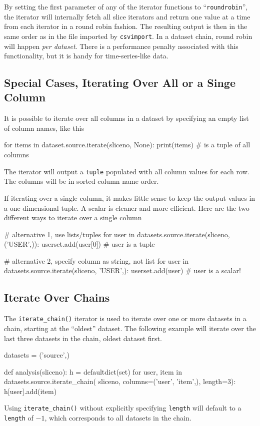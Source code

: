 By setting the first parameter of any of the iterator functions to
``\texttt{roundrobin}'', the iterator will internally fetch all slice
iterators and return one value at a time from each iterator in a round
robin fashion.  The resulting output is then in the same order as in
the file imported by \texttt{csvimport}.  In a dataset chain, round
robin will happen \textsl{per dataset}.  There is a performance
penalty associated with this functionality, but it is handy for
time-series-like data.



\subsection{Special Cases, Iterating Over All or a Singe Column}
It is possible to iterate over all columns in a dataset by specifying
an empty list of column names, like this
\begin{python}
for items in dataset.source.iterate(sliceno, None):
    print(items)  # is a tuple of all columns
\end{python}
The iterator will output a \texttt{tuple} populated with all column
values for each row.  The columns will be in sorted column name order.

If iterating over a single column, it makes little sense to keep the
output values in a one-dimensional tuple.  A scalar is cleaner and
more efficient.  Here are the two different ways to iterate over a
single column
\begin{python}
# alternative 1, use lists/tuples
for user in datasets.source.iterate(sliceno, ('USER',)):
    userset.add(user[0])  # user is a tuple

# alternative 2, specify column as string, not list
for user in datasets.source.iterate(sliceno, 'USER',):
    userset.add(user)     # user is a scalar!
\end{python}



\subsection{Iterate Over Chains}
The \texttt{iterate\_chain()} iterator is used to iterate over one or
more datasets in a chain, starting at the ``oldest'' dataset.  The
following example will iterate over the last three datasets in the
chain, oldest dataset first.
\begin{python}
datasets = ('source',)

def analysis(sliceno):
    h = defaultdict(set)
    for user, item in datasets.source.iterate_chain(
                           sliceno, columns=('user', 'item',), length=3):
        h[user].add(item)
\end{python}
Using \texttt{iterate\_chain()} without explicitly specifying
\texttt{length} will default to a \texttt{length} of $-1$, which
corresponds to all datasets in the chain.

